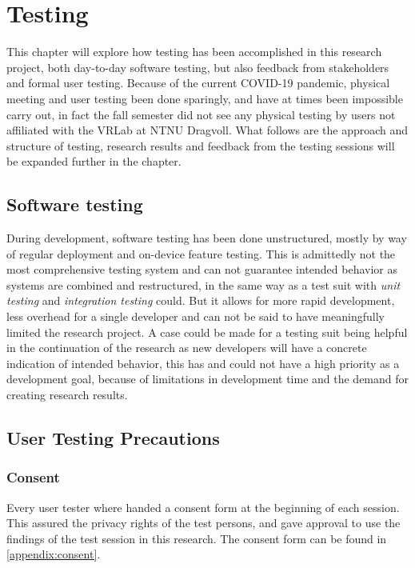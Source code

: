 \chapter{Testing}


This chapter will explore how testing has been accomplished in this research project, both day-to-day software testing, but also feedback from stakeholders and formal user testing. Because of the current COVID-19 pandemic, physical meeting and user testing been done sparingly, and have at times been impossible carry out, in fact the fall semester did not see any physical testing by users not affiliated with the VRLab at NTNU Dragvoll. What follows are the approach and structure of testing, research results and feedback from the testing sessions will be expanded further in the  chapter.

\section{Software testing}
During development, software testing has been done unstructured, mostly by way of regular deployment and on-device feature testing. This is admittedly not the most comprehensive testing system and can not guarantee intended behavior as systems are combined and restructured, in the same way as a test suit with \textit{unit testing} and \textit{integration testing} could. But it allows for more rapid development, less overhead for a single developer and can not be said to have meaningfully limited the research project. A case could be made for a testing suit being helpful in the continuation of the research as new developers will have a concrete indication of intended behavior, this has and could not have a high priority as a development goal, because of limitations in development time and the demand for creating research results.

\section{User Testing Precautions}

\subsection*{Consent}
Every user tester where handed a consent form at the beginning of each session. This assured the privacy rights of the test persons, and gave approval to use the findings of the test session in this research. The consent form can be found in \autoref{appendix:consent}.

